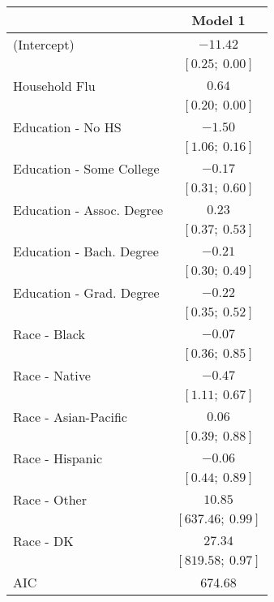 \documentclass[12pt]{article}
\begin{document}
\begin{table}
\begin{center}
\begin{tabular}{l c }
\hline
 & Model 1 \\
\hline
(Intercept)            & $-11.42$          \\
                       & $[0.25;\ 0.00]$   \\
Household Flu          & $0.64$            \\
                       & $[0.20;\ 0.00]$   \\
Education - No HS         & $-1.50$           \\
                       & $[1.06;\ 0.16]$   \\
Education - Some College  & $-0.17$           \\
                       & $[0.31;\ 0.60]$   \\
Education - Assoc. Degree & $0.23$            \\
                       & $[0.37;\ 0.53]$   \\
Education - Bach. Degree  & $-0.21$           \\
                       & $[0.30;\ 0.49]$   \\
Education - Grad. Degree  & $-0.22$           \\
                       & $[0.35;\ 0.52]$   \\
Race - Black              & $-0.07$           \\
                       & $[0.36;\ 0.85]$   \\
Race - Native             & $-0.47$           \\
                       & $[1.11;\ 0.67]$   \\
Race - Asian-Pacific      & $0.06$            \\
                       & $[0.39;\ 0.88]$   \\
Race - Hispanic           & $-0.06$           \\
                       & $[0.44;\ 0.89]$   \\
Race - Other              & $10.85$           \\
                       & $[637.46;\ 0.99]$ \\
Race - DK                 & $27.34$           \\
                       & $[819.58;\ 0.97]$ \\
\hline
AIC                    & 674.68            \\

\end{tabular}
\end{center}
\end{table}
\end{document}
